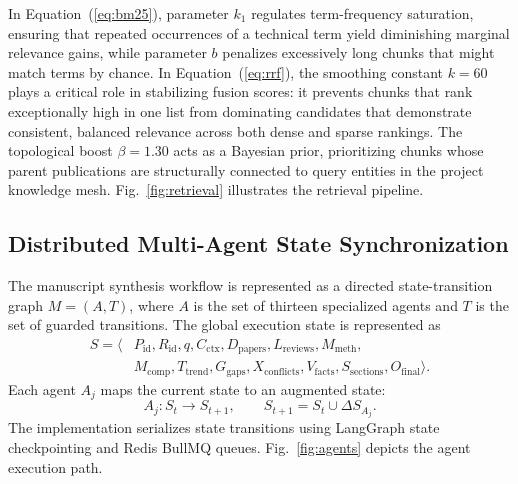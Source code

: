 \documentclass[conference]{IEEEtran}
\begin{document}
In Equation~(\ref{eq:bm25}), parameter $k_1$ regulates term-frequency saturation, ensuring that repeated occurrences of a technical term yield diminishing marginal relevance gains, while parameter $b$ penalizes excessively long chunks that might match terms by chance. In Equation~(\ref{eq:rrf}), the smoothing constant $k=60$ plays a critical role in stabilizing fusion scores: it prevents chunks that rank exceptionally high in one list from dominating candidates that demonstrate consistent, balanced relevance across both dense and sparse rankings. The topological boost $\beta=1.30$ acts as a Bayesian prior, prioritizing chunks whose parent publications are structurally connected to query entities in the project knowledge mesh. Fig.~\ref{fig:retrieval} illustrates the retrieval pipeline.

\subsection{Distributed Multi-Agent State Synchronization}
The manuscript synthesis workflow is represented as a directed state-transition graph $M = (A, T)$, where $A$ is the set of thirteen specialized agents and $T$ is the set of guarded transitions. The global execution state is represented as
\begin{align}
S = \langle &P_{\mathrm{id}}, R_{\mathrm{id}}, q, C_{\mathrm{ctx}}, D_{\mathrm{papers}}, L_{\mathrm{reviews}}, M_{\mathrm{meth}}, \nonumber\\
&M_{\mathrm{comp}}, T_{\mathrm{trend}}, G_{\mathrm{gaps}}, X_{\mathrm{conflicts}}, V_{\mathrm{facts}}, S_{\mathrm{sections}}, O_{\mathrm{final}}\rangle.
\label{eq:state}
\end{align}
Each agent $A_j$ maps the current state to an augmented state:
\begin{equation}
A_j: S_t \longrightarrow S_{t+1}, \qquad S_{t+1} = S_t \cup \Delta S_{A_j}.
\label{eq:transition}
\end{equation}
The implementation serializes state transitions using LangGraph state checkpointing and Redis BullMQ queues. Fig.~\ref{fig:agents} depicts the agent execution path.
\end{document}
